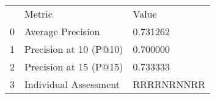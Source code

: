 \begin{tabular}{lll}
 & Metric & Value \\
0 & Average Precision & 0.731262 \\
1 & Precision at 10 (P@10) & 0.700000 \\
2 & Precision at 15 (P@15) & 0.733333 \\
3 & Individual Assessment & RRRRNRNNRR \\
\end{tabular}
